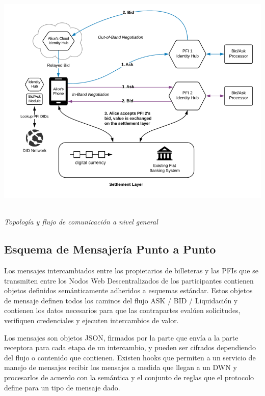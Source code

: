 \documentclass[11pt]{article}
\begin{document}
\begin{center}
  \\ \includegraphics[width=15.61cm,height=11.83cm]{./diagrams/topology.png}{\small \textit{Topología y flujo de comunicación a nivel general}}
\end{center}


\vspace{1\baselineskip}
\subsection{Esquema de Mensajería Punto a Punto}

\vspace{1\baselineskip}
Los mensajes intercambiados entre los propietarios de billeteras y las PFIs que se transmiten entre los Nodos Web Descentralizados de los participantes contienen objetos definidos semánticamente adheridos a esquemas estándar. Estos objetos de mensaje definen todos los caminos del flujo ASK / BID / Liquidación y contienen los datos necesarios para que las contrapartes evalúen solicitudes, verifiquen credenciales y ejecuten intercambios de valor.

\vspace{1\baselineskip}
Los mensajes son objetos JSON, firmados por la parte que envía a la parte receptora para cada etapa de un intercambio, y pueden ser cifrados dependiendo del flujo o contenido que contienen. Existen hooks que permiten a un servicio de manejo de mensajes recibir los mensajes a medida que llegan a un DWN y procesarlos de acuerdo con la semántica y el conjunto de reglas que el protocolo define para un tipo de mensaje dado.
\end{document}
